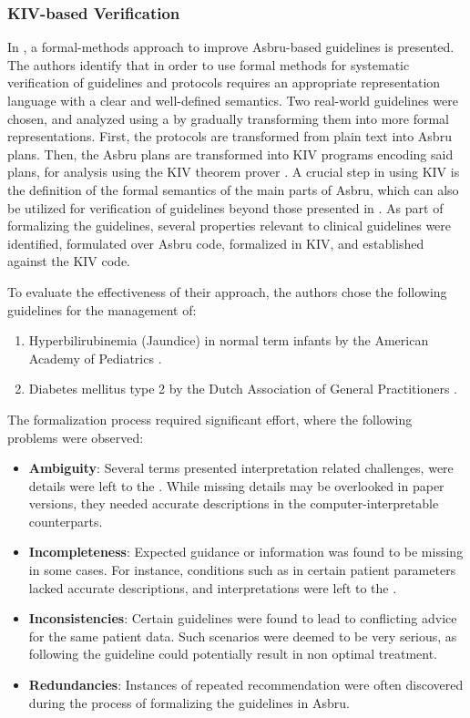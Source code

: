 \subsubsection{KIV-based Verification}

In \cite{TenAIM06}, a formal-methods approach to improve Asbru-based guidelines
is presented. The authors identify that in order to use formal methods
for systematic verification of guidelines and protocols requires
an appropriate representation language with a clear and well-defined semantics.
Two real-world guidelines were chosen, and analyzed using a
by gradually transforming them into more formal representations.
First, the protocols are transformed from plain text into Asbru plans. Then,
the Asbru plans are transformed into KIV programs encoding said plans, for analysis
using the KIV theorem prover \cite{BalserFASE00}. A crucial step in using
KIV is the definition of the formal semantics of the main parts of Asbru,
which can also be utilized for verification of guidelines beyond those
presented in \cite{TenAIM06}. As part of formalizing the guidelines,
several properties relevant to clinical guidelines were identified,
formulated over Asbru code, formalized in KIV, and established against
the KIV code.

To evaluate the effectiveness of their approach, the authors chose the following
guidelines for the management of:
\begin{enumerate}[label=(\alph*)]
  \item Hyperbilirubinemia (Jaundice) in normal term infants by the American
    Academy of Pediatrics \cite{JaundiceAAP94}.
  \item Diabetes mellitus type 2 by the Dutch Association of General
    Practitioners \cite{RuttenNHG99}.
\end{enumerate}
The formalization process required significant effort, where the
following problems were observed:
\begin{itemize}
  \item \textbf{Ambiguity}: Several terms presented interpretation
    related challenges, were details were left to the \HCP{}. While
    missing details may be overlooked in paper versions, they needed
    accurate descriptions in the computer-interpretable counterparts.
  \item \textbf{Incompleteness}: Expected guidance or information
    was found to be missing in some cases. For instance, conditions
    such as  in certain patient parameters lacked
    accurate descriptions, and interpretations were left to the \HCPs{}.
  \item \textbf{Inconsistencies}: Certain guidelines were found to lead
    to conflicting advice for the same patient data. Such scenarios
    were deemed to be very serious, as following the guideline could
    potentially result in non optimal treatment.
  \item \textbf{Redundancies}: Instances of repeated recommendation were
    often discovered during the process of formalizing the guidelines in Asbru.
\end{itemize}

